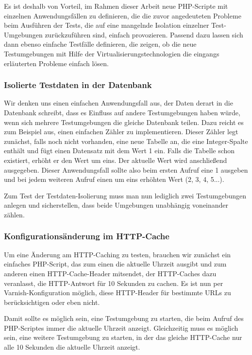 Es ist deshalb von Vorteil, im Rahmen dieser Arbeit neue PHP-Scripte mit einzelnen Anwendungsfällen zu definieren, die die zuvor angedeuteten Probleme beim Ausführen der Tests, die auf eine mangelnde Isolation einzelner Test-Umgebungen zurückzuführen sind, einfach provozieren. Passend dazu lassen sich dann ebenso einfache Testfälle definieren, die zeigen, ob die neue Testumgebungen mit Hilfe der Virtualisierungstechnologien die eingangs erläuterten Probleme einfach lösen.

\subsubsection{Isolierte Testdaten in der Datenbank}

Wir denken uns einen einfachen Anwendungsfall aus, der Daten derart in die Datenbank schreibt, dass es Einfluss auf andere Testumgebungen haben würde, wenn sich mehrere Testumgebungen die gleiche Datenbank teilen. Dazu reicht es zum Beispiel aus, einen einfachen Zähler zu implementieren. Dieser Zähler legt zunächst, falls noch nicht vorhanden, eine neue Tabelle an, die eine Integer-Spalte enthält und fügt einen Datensatz mit dem Wert 1 ein. Falls die Tabelle schon existiert, erhöht er den Wert um eins. Der aktuelle Wert wird anschließend ausgegeben. Dieser Anwendungsfall sollte also beim ersten Aufruf eine 1 ausgeben und bei jedem weiteren Aufruf einen um eins erhöhten Wert (2, 3, 4, 5...).

Zum Test der Testdaten-Isolierung muss man nun lediglich zwei Testumgebungen anlegen und sicherstellen, dass beide Umgebungen unabhängig voneinander zählen.

\subsubsection{Konfigurationsänderung im HTTP-Cache}

Um eine Änderung am HTTP-Caching zu testen, brauchen wir zunächst ein einfaches PHP-Script, das zum einen die aktuelle Uhrzeit ausgibt und zum anderen einen HTTP-Cache-Header mitsendet, der HTTP-Caches dazu veranlasst, die HTTP-Antwort für 10 Sekunden zu cachen.
Es ist nun per Varnish-Konfiguration möglich, diese HTTP-Header für bestimmte URLs zu berücksichtigen oder eben nicht.

Damit sollte es möglich sein, eine Testumgebung zu starten, die beim Aufruf des PHP-Scriptes immer die aktuelle Uhrzeit anzeigt. Gleichzeitig muss es möglich sein, eine weitere Testumgebung zu starten, in der das gleiche HTTP-Cache nur alle 10 Sekunden die aktuelle Uhrzeit anzeigt.

